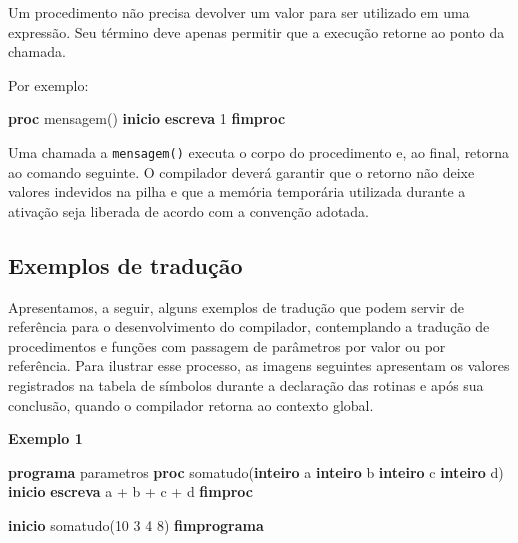 \documentclass[
  brazilian,
  letterpaper,
]{book}
\newenvironment{Shaded}{\begin{snugshade}}{\end{snugshade}}
\newcommand{\DecValTok}[1]{\textcolor[rgb]{0.68,0.00,0.00}{#1}}
\newcommand{\KeywordTok}[1]{\textcolor[rgb]{0.00,0.23,0.31}{\textbf{#1}}}
\newcommand{\NormalTok}[1]{\textcolor[rgb]{0.00,0.23,0.31}{#1}}
\theoremstyle{plain}
\theoremstyle{definition}
\theoremstyle{remark}
\begin{document}
Um procedimento não precisa devolver um valor para ser utilizado em uma
expressão. Seu término deve apenas permitir que a execução retorne ao
ponto da chamada.

Por exemplo:

\begin{Shaded}
\begin{Highlighting}[]
\KeywordTok{proc}\NormalTok{ mensagem()}
\KeywordTok{inicio}
    \KeywordTok{escreva} \DecValTok{1}
\KeywordTok{fimproc}
\end{Highlighting}
\end{Shaded}

Uma chamada a \texttt{mensagem()} executa o corpo do procedimento e, ao
final, retorna ao comando seguinte. O compilador deverá garantir que o
retorno não deixe valores indevidos na pilha e que a memória temporária
utilizada durante a ativação seja liberada de acordo com a convenção
adotada.

\subsection{Exemplos de tradução}\label{exemplos-de-traduuxe7uxe3o}

Apresentamos, a seguir, alguns exemplos de tradução que podem servir de
referência para o desenvolvimento do compilador, contemplando a tradução
de procedimentos e funções com passagem de parâmetros por valor ou por
referência. Para ilustrar esse processo, as imagens seguintes apresentam
os valores registrados na tabela de símbolos durante a declaração das
rotinas e após sua conclusão, quando o compilador retorna ao contexto
global.

\textbf{Exemplo 1}

\begin{Shaded}
\begin{Highlighting}[]
\KeywordTok{programa}\NormalTok{ parametros}
  \KeywordTok{proc}\NormalTok{ somatudo(}\KeywordTok{inteiro}\NormalTok{ a }
                 \KeywordTok{inteiro}\NormalTok{ b }
                 \KeywordTok{inteiro}\NormalTok{ c }
                 \KeywordTok{inteiro}\NormalTok{ d)}
  \KeywordTok{inicio}
    \KeywordTok{escreva}\NormalTok{ a + b + c + d}
  \KeywordTok{fimproc}
  
\KeywordTok{inicio}
\NormalTok{  somatudo(}\DecValTok{10} \DecValTok{3} \DecValTok{4} \DecValTok{8}\NormalTok{)}
\KeywordTok{fimprograma}
\end{Highlighting}
\end{Shaded}
\end{document}

